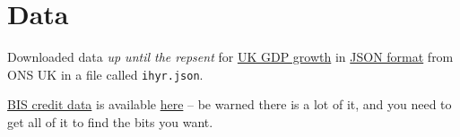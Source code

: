 \documentclass[
  letterpaper,
]{book}
\newenvironment{Shaded}{\begin{snugshade}}{\end{snugshade}}
\newcommand{\AttributeTok}[1]{\textcolor[rgb]{0.40,0.45,0.13}{#1}}
\newcommand{\CommentTok}[1]{\textcolor[rgb]{0.37,0.37,0.37}{#1}}
\newcommand{\DecValTok}[1]{\textcolor[rgb]{0.68,0.00,0.00}{#1}}
\newcommand{\FunctionTok}[1]{\textcolor[rgb]{0.28,0.35,0.67}{#1}}
\newcommand{\NormalTok}[1]{\textcolor[rgb]{0.00,0.23,0.31}{#1}}
\newcommand{\OtherTok}[1]{\textcolor[rgb]{0.00,0.23,0.31}{#1}}
\newcommand{\SpecialCharTok}[1]{\textcolor[rgb]{0.37,0.37,0.37}{#1}}
\newcommand{\StringTok}[1]{\textcolor[rgb]{0.13,0.47,0.30}{#1}}
\begin{document}
\hypertarget{data}{%
\section{Data}\label{data}}

Downloaded data \emph{up until the repsent} for
\href{https://www.ons.gov.uk/economy/grossdomesticproductgdp/timeseries/ihyr}{UK
GDP growth} in
\href{https://www.ons.gov.uk/economy/grossdomesticproductgdp/timeseries/ihyr/data}{JSON
format} from ONS UK in a file called \texttt{ihyr.json}.

\begin{Shaded}
\end{Shaded}

\href{https://www.bis.org/statistics/totcredit.htm}{BIS credit data} is
available
\href{https://www.bis.org/statistics/totcredit/totcredit.xlsx}{here} --
be warned there is a lot of it, and you need to get all of it to find
the bits you want.
\end{document}
